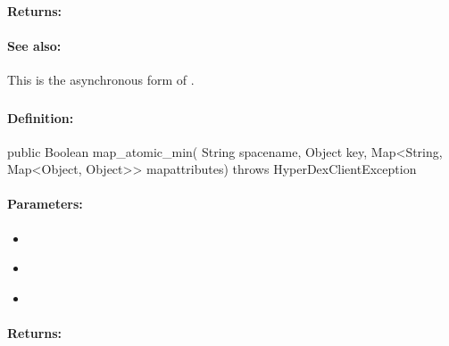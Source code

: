 \paragraph{Returns:}


\paragraph{See also:}  This is the asynchronous form of .

\pagebreak
\subsubsection{}
\label{api:java:map_atomic_min}


\paragraph{Definition:}
\begin{javacode}
public Boolean map_atomic_min(
        String spacename,
        Object key,
        Map<String, Map<Object, Object>> mapattributes) throws HyperDexClientException
\end{javacode}

\paragraph{Parameters:}
\begin{itemize}[noitemsep]
\item {}\\

\item {}\\

\item {}\\

\end{itemize}

\paragraph{Returns:}


